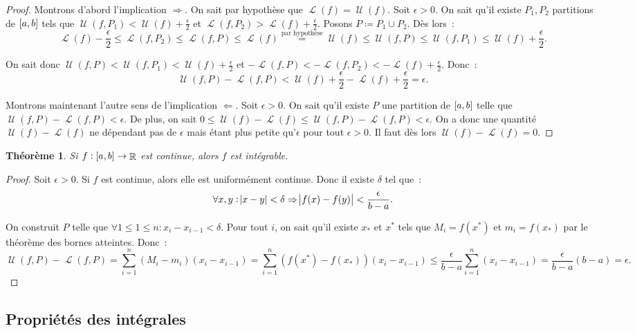 \documentclass{article}
\DeclareMathOperator{\R}{\mathbb R}
\DeclareMathOperator{\Larea}{\mathcal L}
\DeclareMathOperator{\Uarea}{\mathcal U}
\newcommand{\ab}{\interval ab}
\newcommand{\fabr}[1]{#1 : \ab \to \R}
\newtheorem{thm}{Théorème}[section]
\theoremstyle{definition}
\theoremstyle{remark}
\begin{document}
		\begin{proof} Montrons d'abord l'implication $\Rightarrow$. On sait par hypothèse que $\Larea(f) = \Uarea(f)$. Soit $\epsilon > 0$. On sait
		qu'il existe $P_1, P_2$ partitions de $\ab$ tels que $\Uarea(f, P_1) < \Uarea(f)+\frac \epsilon2$ et $\Larea(f, P_2) > \Larea(f) + \frac \epsilon2$.
		Posons $P \coloneqq P_1 \cup P_2$. Dès lors~:
		\[
			\Larea(f) - \frac \epsilon2 \leq \Larea(f, P_2) \leq \Larea(f, P) \leq \Larea(f)
			  \stackrel{\text{par hypothèse}}=
			\Uarea(f) \leq \Uarea(f, P) \leq \Uarea(f, P_1) \leq \Uarea(f) + \frac \epsilon2.
		\]

		On sait donc $\Uarea(f, P) < \Uarea(f, P_1) < \Uarea(f)+\frac \epsilon2$ et $-\Larea(f, P) < -\Larea(f, P_2) < -\Larea(f)+\frac \epsilon2$. Donc~:
		\[\Uarea(f, P) - \Larea(f, P) < \Uarea(f)+\frac \epsilon2-\Larea(f)+\frac \epsilon2 = \epsilon.\]

		Montrons maintenant l'autre sens de l'implication $\Leftarrow$. Soit $\epsilon > 0$. On sait qu'il existe $P$ une partition de $\ab$ telle que
		$\Uarea(f, P) - \Larea(f, P) < \epsilon$. De plus, on sait $0 \leq \Uarea(f)-\Larea(f) \leq \Uarea(f, P)-\Larea(f, P) < \epsilon$. On a donc une
		quantité $\Uarea(f)-\Larea(f)$ ne dépendant pas de $\epsilon$ mais étant plus petite qu'$\epsilon$ pour tout $\epsilon > 0$. Il faut dès lors
		$\Uarea(f)-\Larea(f) = 0$. \end{proof}

		\begin{thm} Si $\fabr f$ est continue, alors $f$ est intégrable. \end{thm}

		\begin{proof} Soit $\epsilon > 0$. Si $f$ est continue, alors elle est uniformément continue. Donc il existe $\delta$ tel que~:
		\[\forall x, y : \abs{x-y} < \delta \Rightarrow \abs{f(x)-f(y)} < \frac \epsilon{b-a}.\]

		On construit $P$ telle que $\forall 1 \leq 1 \leq n : x_i-x_{i-1} < \delta$. Pour tout $i$, on sait qu'il existe $x_*$ et $x^*$ tels que
		$M_i = f(x^*)$ et $m_i = f(x_*)$ par le théorème des bornes atteintes. Donc~:
		\[\Uarea(f, P)-\Larea(f, P) = \sum_{i=1}^n(M_i-m_i)(x_i-x_{i-1}) = \sum_{i=1}^n(f(x^*)-f(x_*))(x_i-x_{i-1}) \leq \frac \epsilon{b-a}\sum_{i=1}^n(x_i-x_{i-1})
		= \frac \epsilon{b-a}(b-a) = \epsilon.\]
		\end{proof}

	\subsection{Propriétés des intégrales}
		
\end{document}
